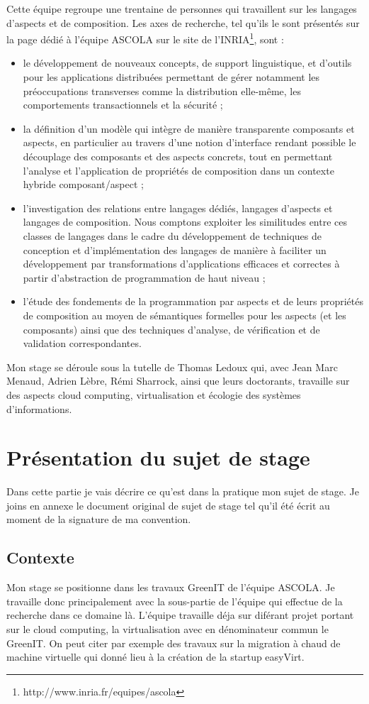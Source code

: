 \documentclass[a4paper, 11pt]{report}
\begin{document}
Cette équipe regroupe une trentaine de personnes qui travaillent sur les langages d'aspects et de composition. Les axes de recherche, tel qu'ils le sont présentés sur la page dédié à l'équipe ASCOLA sur le site de l'INRIA\footnote{http://www.inria.fr/equipes/ascola}, sont :
\begin{itemize}
	\item le développement de nouveaux concepts, de support linguistique, et d'outils pour les applications distribuées permettant de gérer notamment les préoccupations transverses comme la distribution elle-même, les comportements transactionnels et la sécurité ;
	\item la définition d'un modèle qui intègre de manière transparente composants et aspects, en particulier au travers d'une notion d'interface rendant possible le découplage des composants et des aspects concrets, tout en permettant l'analyse et l'application de propriétés de composition dans un contexte hybride composant/aspect ;
	\item l'investigation des relations entre langages dédiés, langages d'aspects et langages de composition. Nous comptons exploiter les similitudes entre ces classes de langages dans le cadre du développement de techniques de conception et d'implémentation des langages de manière à faciliter un développement par transformations d'applications efficaces et correctes à partir d'abstraction de programmation de haut niveau ;
	\item l'étude des fondements de la programmation par aspects et de leurs propriétés de composition au moyen de sémantiques formelles pour les aspects (et les composants) ainsi que des techniques d'analyse, de vérification et de validation correspondantes.
\end{itemize}

Mon stage se déroule sous la tutelle de Thomas Ledoux qui, avec Jean Marc Menaud, Adrien Lèbre, Rémi Sharrock, ainsi que leurs doctorants, travaille sur des aspects cloud computing, virtualisation et écologie des systèmes d'informations.

\section{Présentation du sujet de stage}
Dans cette partie je vais décrire ce qu'est dans la pratique mon sujet de stage. Je joins en annexe le document original de sujet de stage tel qu'il été écrit au moment de la signature de ma convention.

\subsection{Contexte}
Mon stage se positionne dans les travaux GreenIT de l’équipe ASCOLA. Je travaille donc principalement avec la sous-partie de l'équipe qui effectue de la recherche dans ce domaine là. L'équipe travaille déja sur diférant projet portant sur le cloud computing, la virtualisation avec en dénominateur commun le GreenIT. On peut citer par exemple des travaux sur la migration à chaud de machine virtuelle qui donné lieu à la création de la startup easyVirt.
\end{document}
